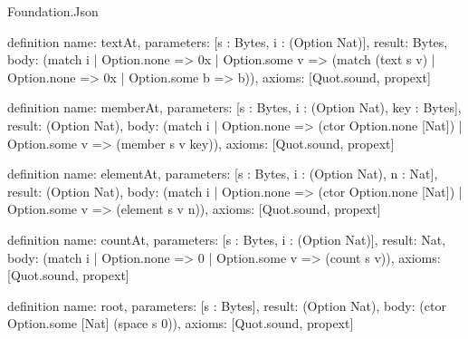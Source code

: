 \begin{lexlean}{Foundation.Json}
\begin{semanticmodule}
definition{
  name: textAt,
  parameters: [s : Bytes, i : (Option Nat)],
  result: Bytes,
  body: (match i
    | Option.none => 0x
    | Option.some v => (match (text s v) | Option.none => 0x | Option.some b => b)),
  axioms: [Quot.sound, propext]
}

definition{
  name: memberAt,
  parameters: [s : Bytes, i : (Option Nat), key : Bytes],
  result: (Option Nat),
  body: (match i | Option.none => (ctor Option.none [Nat]) | Option.some v => (member s v key)),
  axioms: [Quot.sound, propext]
}

definition{
  name: elementAt,
  parameters: [s : Bytes, i : (Option Nat), n : Nat],
  result: (Option Nat),
  body: (match i | Option.none => (ctor Option.none [Nat]) | Option.some v => (element s v n)),
  axioms: [Quot.sound, propext]
}

definition{
  name: countAt,
  parameters: [s : Bytes, i : (Option Nat)],
  result: Nat,
  body: (match i | Option.none => 0 | Option.some v => (count s v)),
  axioms: [Quot.sound, propext]
}

definition{
  name: root,
  parameters: [s : Bytes],
  result: (Option Nat),
  body: (ctor Option.some [Nat] (space s 0)),
  axioms: [Quot.sound, propext]
}
\end{semanticmodule}
\end{lexlean}
